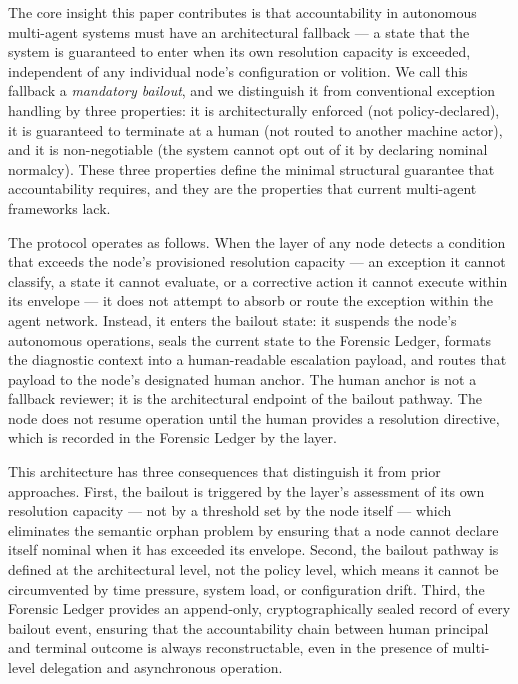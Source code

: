 The core insight this paper contributes is that accountability in autonomous multi-agent systems must have an architectural fallback — a state that the system is guaranteed to enter when its own resolution capacity is exceeded, independent of any individual node's configuration or volition. We call this fallback a \emph{mandatory bailout}, and we distinguish it from conventional exception handling by three properties: it is architecturally enforced (not policy-declared), it is guaranteed to terminate at a human (not routed to another machine actor), and it is non-negotiable (the system cannot opt out of it by declaring nominal normalcy). These three properties define the minimal structural guarantee that accountability requires, and they are the properties that current multi-agent frameworks lack.

The protocol operates as follows. When the \bounds{} layer of any node detects a condition that exceeds the node's provisioned resolution capacity — an exception it cannot classify, a state it cannot evaluate, or a corrective action it cannot execute within its envelope — it does not attempt to absorb or route the exception within the agent network. Instead, it enters the bailout state: it suspends the node's autonomous operations, seals the current state to the Forensic Ledger, formats the diagnostic context into a human-readable escalation payload, and routes that payload to the node's designated human anchor. The human anchor is not a fallback reviewer; it is the architectural endpoint of the bailout pathway. The node does not resume operation until the human provides a resolution directive, which is recorded in the Forensic Ledger by the \fact{} layer.

This architecture has three consequences that distinguish it from prior approaches. First, the bailout is triggered by the \bounds{} layer's assessment of its own resolution capacity — not by a threshold set by the node itself — which eliminates the semantic orphan problem by ensuring that a node cannot declare itself nominal when it has exceeded its envelope. Second, the bailout pathway is defined at the architectural level, not the policy level, which means it cannot be circumvented by time pressure, system load, or configuration drift. Third, the Forensic Ledger provides an append-only, cryptographically sealed record of every bailout event, ensuring that the accountability chain between human principal and terminal outcome is always reconstructable, even in the presence of multi-level delegation and asynchronous operation.

